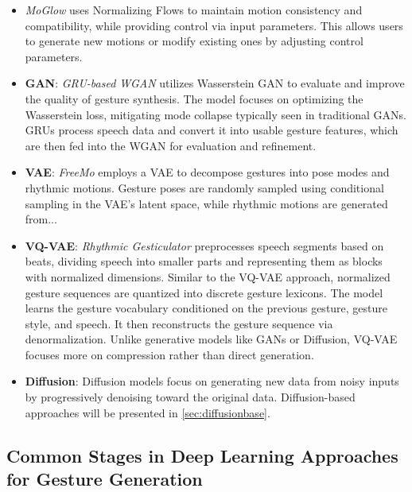 \begin{itemize}
	\item \textit{MoGlow} \cite{henter2020moglow} uses Normalizing Flows to maintain motion consistency and compatibility, while providing control via input parameters. This allows users to generate new motions or modify existing ones by adjusting control parameters.
	
	\item \textbf{GAN}: \textit{GRU-based WGAN} \cite{wu2021probabilistic} utilizes Wasserstein GAN to evaluate and improve the quality of gesture synthesis. The model focuses on optimizing the Wasserstein loss, mitigating mode collapse typically seen in traditional GANs. GRUs process speech data and convert it into usable gesture features, which are then fed into the WGAN for evaluation and refinement.
	
	\item \textbf{VAE}: \textit{FreeMo} \cite{xu2022freeform} employs a VAE to decompose gestures into pose modes and rhythmic motions. Gesture poses are randomly sampled using conditional sampling in the VAE's latent space, while rhythmic motions are generated from...
	
	\item \textbf{VQ-VAE}: \textit{Rhythmic Gesticulator} \cite{ao2022rhythmic} preprocesses speech segments based on beats, dividing speech into smaller parts and representing them as blocks with normalized dimensions. Similar to the VQ-VAE approach, normalized gesture sequences are quantized into discrete gesture lexicons. The model learns the gesture vocabulary conditioned on the previous gesture, gesture style, and speech. It then reconstructs the gesture sequence via denormalization. Unlike generative models like GANs or Diffusion, VQ-VAE focuses more on compression rather than direct generation.
	
	\item \textbf{Diffusion}: Diffusion models focus on generating new data from noisy inputs by progressively denoising toward the original data. Diffusion-based approaches will be presented in \autoref{sec:diffusionbase}.
\end{itemize}




\subsection{Common Stages in Deep Learning Approaches for Gesture Generation}
\label{sec:commonstage}


